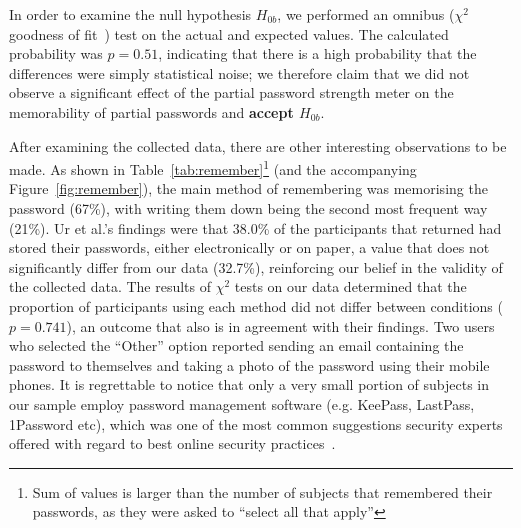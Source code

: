     In order to examine the null hypothesis $H_{0b}$, we performed an omnibus ($\chi^2$ goodness of fit~\cite{chi_sq}) test on the actual and expected values. The calculated probability was $p=0.51$, indicating that there is a high probability that the differences were simply statistical noise; we therefore claim that we did not observe a significant effect of the partial password strength meter on the memorability of partial passwords and \textbf{accept $H_{0b}$}.

    After examining the collected data, there are other interesting observations to be made. As shown in Table~\ref{tab:remember}\footnote{Sum of values is larger than the number of subjects that remembered their passwords, as they were asked to ``select all that apply''} (and the accompanying Figure~\ref{fig:remember}), the main method of remembering was memorising the password (67\%), with writing them down being the second most frequent way (21\%). Ur et al.'s findings were that 38.0\% of the participants that returned had stored their passwords, either electronically or on paper, a value that does not significantly differ from our data (32.7\%), reinforcing our belief in the validity of the collected data. The results of $\chi^2$ tests on our data determined that the proportion of participants using each method did not differ between conditions ($p=0.741$), an outcome that also is in agreement with their findings. Two users who selected the ``Other'' option reported sending an email containing the password to themselves and taking a photo of the password using their mobile phones. It is regrettable to notice that only a very small portion of subjects in our sample employ password management software (e.g. KeePass, LastPass, 1Password etc), which was one of the most common suggestions security experts offered with regard to best online security practices~\cite{security_practices_experts}.

